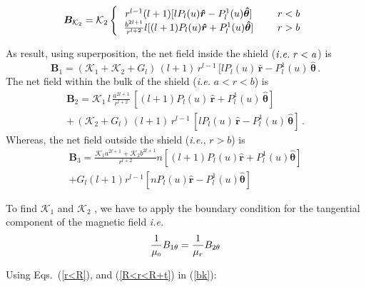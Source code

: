 \begin{equation}\label{r=R+t}
\bm B_{\mathcal{K}_2} =\mathcal{K}_2
\left \{
  \begin{tabular}{ccc}
  $r^{l-1} (l+1)[l P_l(u)\bm{\hat{r}} -  P_l^1(u)\bm{\hat{\theta}} ]$ &  & $r<b$  \\
  $\frac{b^{2l+1}}{r^{l+2}}l[(l+1) P_l(u)\bm{\hat{r}} +  P_l^1(u) \bm{\hat{\theta}} ]$ &  & $r>b$  
  \end{tabular}
\right.
\end{equation}

As result, using superposition, the net field inside the shield ($\it{i.e.}\;r<a$) is 
\begin{equation}\label{r<R}
\bm B_1 = (\mathcal{K}_1+\mathcal{K}_2+G_l) \, (l+1)\, r^{l-1} \, [l P_l(u) \, \bm{\hat{r}} -  P_l^1(u)  \, \bm{\hat{\theta}} \, .
\end{equation}
%
The net field  within the bulk of the shield (\textit{i.e.} $a<r<b$)  is 
\begin{multline}\label{R<r<R+t}
\bm B_2 = \mathcal{K}_1 \, l\, \frac{a^{2l+1}}{r^{l+2}} \,[(l+1) P_l(u) \, \bm{\hat{r}} +  P_l^1(u)  \, \bm{\hat{\theta}} ] \, \\ +\, (\mathcal{K}_2+G_l) \, (l+1)\, r^{l-1} \, [l P_l(u) \, \bm{\hat{r}} -  P_l^1(u)  \, \bm{\hat{\theta}} ] \, .
\end{multline}
%
Whereas, the net field  outside the shield (\textit{i.e.}, $r>b$) is
\begin{multline}\label{r>R}
\bm B_3 =\frac{\mathcal{K}_1a^{2l+1} + \mathcal{K}_2 b^{2l+1} }{r^{l+2}} n [(l+1) P_l(u) \bm{\hat{r}} +  P_l^1(u)  \bm{\hat{\theta}} ]  \\+ G_l (l+1) r^{l-1} [n P_l(u) \bm{\hat{r}} - P_l^1(u)  \bm{\hat{\theta}} ]
\end{multline}

To find \(\mathcal{K}_1\) and \(\mathcal{K}_2\) , we have to apply the boundary condition for the tangential component of the magnetic field \textit{i.e.}
\begin{equation}\label{bk}
\frac{1}{\mu_{\scriptscriptstyle 0}} B_{1\theta}=  \frac{1}{\mu_r} B_{2\theta}  
\end{equation}

Using Eqs.~(\ref{r<R}), and (\ref{R<r<R+t}) in (\ref{bk}):


